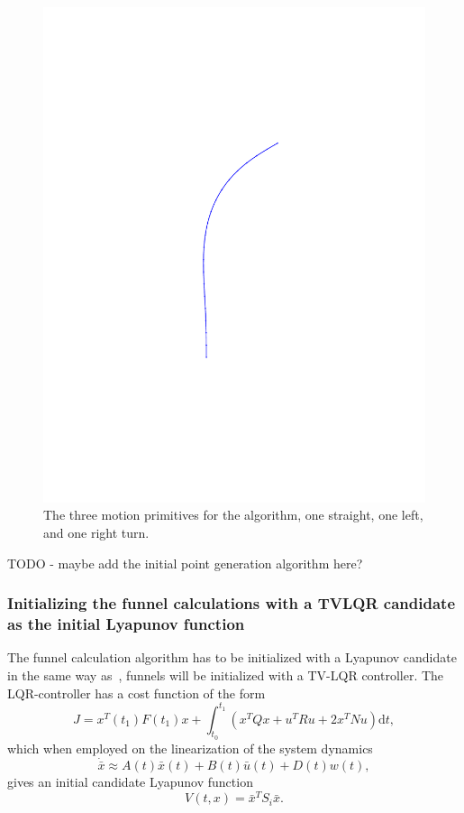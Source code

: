 \begin{figure}
\begin{minipage}[b]{0.4\textwidth}
    \includegraphics[width=\textwidth]{figures/method/right-trajector}
  \end{minipage}
  \caption{The three motion primitives for the \rrtfunnel{} algorithm, one
    straight, one left, and one right turn.}
  \label{fig:initial-trajectories}
\end{figure}

TODO - maybe add the initial point generation algorithm here?

\subsubsection{Initializing the funnel calculations with a TVLQR candidate as
  the initial Lyapunov function}

The funnel calculation algorithm has to be initialized with a Lyapunov candidate
in the same way as~\cite[Majumdar]{majumdarFunnelLibrariesRealtime2017}, funnels
will be initialized with a \ac{TV-LQR} controller. The \ac{LQR}-controller has a
cost function of the form
\begin{equation}
  J = x^{T}(t_1)F(t_1)x + \int_{t_{0}}^{t_{1}} \left( x^{T}Qx + u^{T}Ru + 2x^TNu \right) \mathrm{d}t,
\end{equation}
which when employed on the linearization of the system dynamics
\begin{equation}
  \dot{\bar{x}} \approx A(t)\bar{x}(t) + B(t)\bar{u}(t) +D(t)w(t),
\end{equation}
gives an initial candidate Lyapunov function
\begin{equation}
  V(t,x) = {\bar{x}}^{T}S_{i}\bar{x}.
\end{equation}

